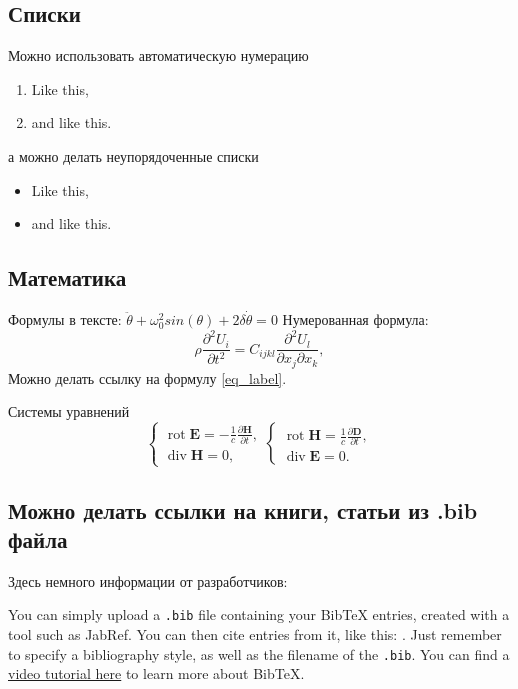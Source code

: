 \documentclass{article}
\DeclareMathOperator\rot{rot}
\DeclareMathOperator\diver{div}
\begin{document}
\subsection{Списки}

Можно использовать автоматическую нумерацию

\begin{enumerate}
\item Like this,
\item and like this.
\end{enumerate}
а можно делать неупорядоченные списки
\begin{itemize}
\item Like this,
\item and like this.
\end{itemize}

\subsection{Математика}
Формулы в тексте: $\ddot{\theta}+\omega_0^2 sin(\theta)+2\delta\dot{\theta}=0$
Нумерованная формула:
\begin{equation}
\rho\frac{\partial^{2}U_{i}}{\partial t^{2}}=C_{ijkl}\frac{\partial^{2}U_{l}}{\partial x_{j}\partial x_{k}},\label{eq_label}
\end{equation}
Можно делать ссылку на формулу \ref{eq_label}.

Системы уравнений
\begin{equation}
\begin{cases}
\rot\textbf{E}=-\frac{1}{c}\frac{\partial\textbf{H}}{\partial t},\\
\diver\textbf{H}=0,
\end{cases}\begin{cases}
\rot\textbf{H}=\frac{1}{c}\frac{\partial\textbf{D}}{\partial t},\\
\diver\textbf{E}=0.
\end{cases}\label{max}
\end{equation}


\subsection*{Можно делать ссылки на книги, статьи из .bib файла}
Здесь немного информации от разработчиков:

You can simply upload a \verb|.bib| file containing your BibTeX entries, created with a tool such as JabRef. You can then cite entries from it, like this: \cite{greenwade93}. Just remember to specify a bibliography style, as well as the filename of the \verb|.bib|. You can find a \href{https://www.overleaf.com/help/97-how-to-include-a-bibliography-using-bibtex}{video tutorial here} to learn more about BibTeX.




\end{document}
